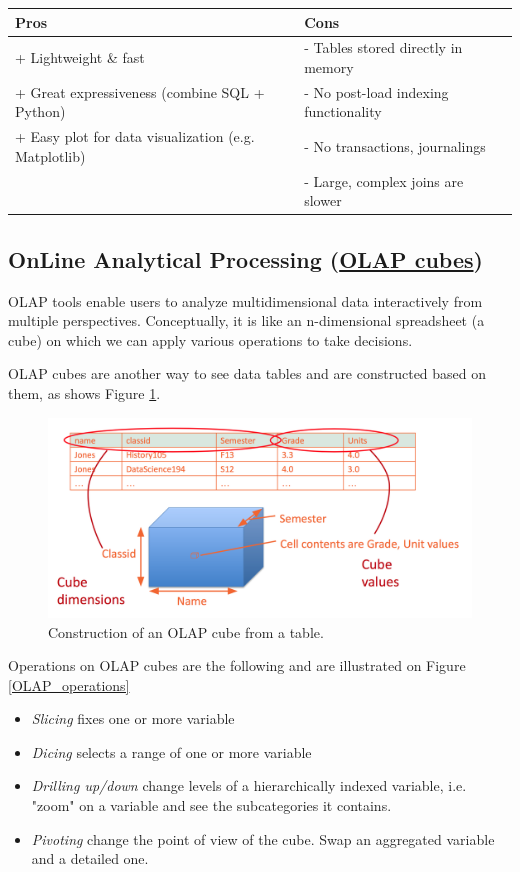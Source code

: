 \begin{center} %
\begin{tabular} {| l | l |}
\hline
\bf Pros & \bf Cons \\ \hline
+ Lightweight \& fast & - Tables stored directly in memory \\
+ Great expressiveness (combine SQL + Python) & - No post-load indexing functionality\\
+ Easy plot for data visualization (e.g. Matplotlib) & - No transactions, journalings\\ 
& - Large, complex joins are slower \\ \hline
\end{tabular}
\end{center}

\subsection{OnLine Analytical Processing (\href{https://en.wikipedia.org/wiki/OLAP\_cube}{OLAP cubes})}

OLAP tools enable users to analyze multidimensional data interactively from multiple perspectives. Conceptually, it is like an n-dimensional spreadsheet (a cube) on which we can apply various operations to take decisions.

OLAP cubes are another way to see data tables and are constructed based on them, as shows Figure \ref{OLAP_cubes}.

\begin{figure}[H]%
 \centering
 \includegraphics[width=12cm]{./img/02/OLAP_cube}
 \caption{\label{OLAP_cubes} Construction of an OLAP cube from a table.}
\end{figure}

Operations on OLAP cubes are the following and are illustrated on Figure \ref{OLAP_operations}
\begin{itemize}
	\item \emph{Slicing} fixes one or more variable
	\item \emph{Dicing} selects a range of one or more variable
	\item \emph{Drilling up/down} change levels of a hierarchically indexed variable, i.e. "zoom" on a variable and see the subcategories it contains.
	\item \emph{Pivoting} change the point of view of the cube. Swap an aggregated variable and a detailed one.
\end{itemize}

